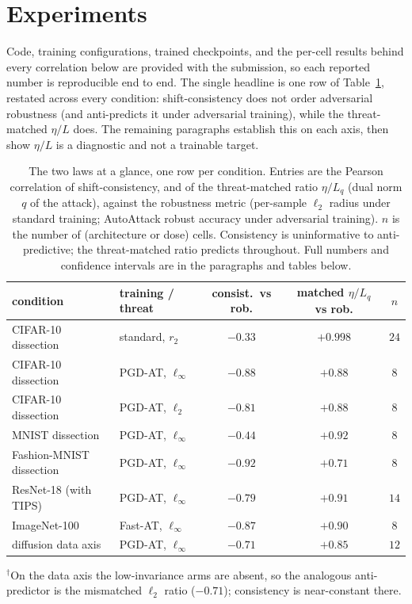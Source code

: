 \documentclass{article}
\theoremstyle{definition}
\begin{document}
\section{Experiments}\label{sec:exp}
Code, training configurations, trained checkpoints, and the per-cell results behind every correlation below are provided with the submission, so each reported number is reproducible end to end. The single headline is one row of Table~\ref{tab:glance}, restated across every condition: shift-consistency does not order adversarial robustness (and anti-predicts it under adversarial training), while the threat-matched $\eta/L$ does. The remaining paragraphs establish this on each axis, then show $\eta/L$ is a diagnostic and not a trainable target.

\begin{table}[h]\centering
\caption{The two laws at a glance, one row per condition. Entries are the Pearson correlation of shift-consistency, and of the threat-matched ratio $\eta/L_q$ (dual norm $q$ of the attack), against the robustness metric (per-sample $\ell_2$ radius under standard training; AutoAttack robust accuracy under adversarial training). $n$ is the number of (architecture or dose) cells. Consistency is uninformative to anti-predictive; the threat-matched ratio predicts throughout. Full numbers and confidence intervals are in the paragraphs and tables below.}
\label{tab:glance}
\small
\begin{tabular}{llccc}
\toprule
condition & training / threat & consist.\ vs rob. & matched $\eta/L_q$ vs rob. & $n$ \\
\midrule
CIFAR-10 dissection      & standard, $r_2$            & $-0.33$ & $+0.998$ & $24$ \\
CIFAR-10 dissection      & PGD-AT, $\ell_\infty$      & $-0.88$ & $+0.88$  & $8$  \\
CIFAR-10 dissection      & PGD-AT, $\ell_2$           & $-0.81$ & $+0.88$  & $8$  \\
MNIST dissection         & PGD-AT, $\ell_\infty$      & $-0.44$ & $+0.92$  & $8$  \\
Fashion-MNIST dissection & PGD-AT, $\ell_\infty$      & $-0.92$ & $+0.71$  & $8$  \\
ResNet-18 (with TIPS)    & PGD-AT, $\ell_\infty$      & $-0.79$ & $+0.91$  & $14$ \\
ImageNet-100             & Fast-AT, $\ell_\infty$     & $-0.87$ & $+0.90$  & $8$  \\
diffusion data axis      & PGD-AT, $\ell_\infty$      & $-0.71$\rlap{$^\dagger$} & $+0.85$  & $12$ \\
\bottomrule
\end{tabular}
\par\smallskip
{\footnotesize $^\dagger$On the data axis the low-invariance arms are absent, so the analogous anti-predictor is the mismatched $\ell_2$ ratio ($-0.71$); consistency is near-constant there.}
\end{table}
\end{document}
